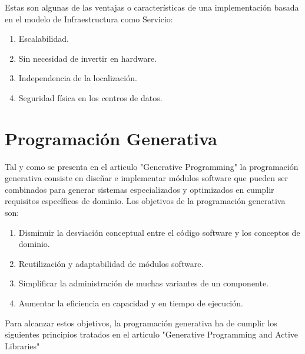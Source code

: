 \documentclass[a4paper,11pt]{book}
\begin{document}
Estas son algunas de las ventajas o características de una implementación basada en el modelo de Infraestructura como Servicio:

\begin{enumerate}
\item Escalabilidad.
\item Sin necesidad de invertir en hardware.
\item Independencia de la localización.
\item Seguridad física en los centros de datos.
\end{enumerate}

\section{Programación Generativa}

Tal y como se presenta en el articulo "Generative Programming"\cite{gp} la programación generativa consiste en diseñar e implementar módulos software que pueden ser combinados para generar sistemas especializados y  optimizados en cumplir requisitos específicos de dominio. Los objetivos de la programación generativa son:

\begin{enumerate}
\item Disminuir la desviación conceptual entre el código software y los conceptos de dominio.
\item Reutilización y adaptabilidad de módulos software.
\item Simplificar la administración de muchas variantes de un componente.
\item Aumentar la eficiencia  en capacidad y en tiempo de ejecución.
\end{enumerate}


Para alcanzar estos objetivos, la programación generativa ha de cumplir los siguientes principios tratados en el articulo "Generative Programming and Active Libraries" \cite{gpl}
\end{document}
